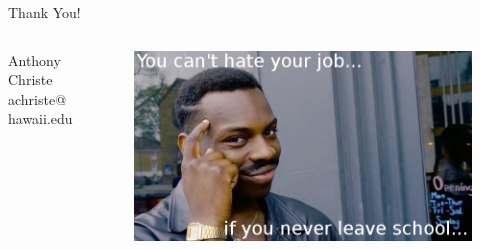 \documentclass{beamer}
\begin{document}
\begin{frame}{Thank You!}
\begin{columns}
	\begin{column}{.35\textwidth}
		Anthony Christe \\
		achriste@hawaii.edu
	\end{column}
	\begin{column}{.65\textwidth}
		\begin{figure}
			\includegraphics[width=\linewidth]{img/meme.png}
		\end{figure}
	\end{column}
\end{columns}
\end{frame}
\end{document}
